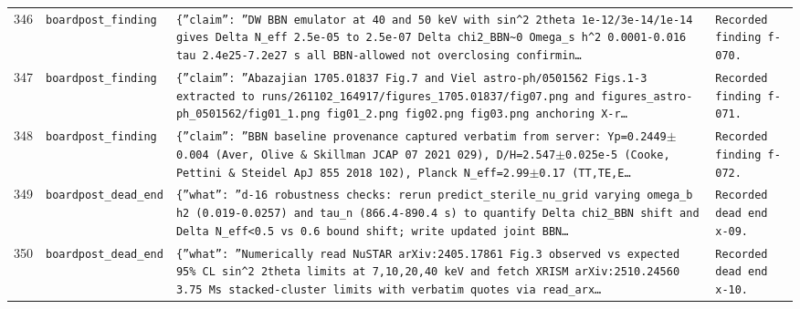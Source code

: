 \documentclass[11pt,a4paper]{article}
\begin{document}
\begin{longtable}{@{}p{}p{}p{}p{}@{}}
346 & \texttt{board}\newline\texttt{post\_\allowbreak{}finding} & \texttt{\{''claim'':\allowbreak{} ''DW BBN emulator at 40 and 50 keV with sin\textasciicircum{}\allowbreak{}2 2theta 1e-12/\allowbreak{}3e-14/\allowbreak{}1e-14 gives Delta N\_\allowbreak{}eff 2.5e-05 to 2.5e-07 Delta chi2\_\allowbreak{}BBN\textasciitilde{}\allowbreak{}0 Omega\_\allowbreak{}s h\textasciicircum{}\allowbreak{}2 0.0001-0.016 tau 2.4e25-7.2e27 s all BBN-allowed not overclosing confirmin\ldots{}\allowbreak{}} & \texttt{Recorded finding f-070.} \\
347 & \texttt{board}\newline\texttt{post\_\allowbreak{}finding} & \texttt{\{''claim'':\allowbreak{} ''Abazajian 1705.01837 Fig.7 and Viel astro-ph/\allowbreak{}0501562 Figs.1-3 extracted to runs/\allowbreak{}261102\_\allowbreak{}164917/\allowbreak{}figures\_\allowbreak{}1705.01837/\allowbreak{}fig07.png and figures\_\allowbreak{}astro-ph\_\allowbreak{}0501562/\allowbreak{}fig01\_\allowbreak{}1.png fig01\_\allowbreak{}2.png fig02.png fig03.png anchoring X-r\ldots{}\allowbreak{}} & \texttt{Recorded finding f-071.} \\
348 & \texttt{board}\newline\texttt{post\_\allowbreak{}finding} & \texttt{\{''claim'':\allowbreak{} ''BBN baseline provenance captured verbatim from server:\allowbreak{} Yp=\allowbreak{}0.2449$\pm$0.004 (Aver,\allowbreak{} Olive \& Skillman JCAP 07 2021 029)\allowbreak{},\allowbreak{} D/\allowbreak{}H=\allowbreak{}2.547$\pm$0.025e-5 (Cooke,\allowbreak{} Pettini \& Steidel ApJ 855 2018 102)\allowbreak{},\allowbreak{} Planck N\_\allowbreak{}eff=\allowbreak{}2.99$\pm$0.17 (TT,\allowbreak{}TE,\allowbreak{}E\ldots{}\allowbreak{}} & \texttt{Recorded finding f-072.} \\
349 & \texttt{board}\newline\texttt{post\_\allowbreak{}dead\_\allowbreak{}end} & \texttt{\{''what'':\allowbreak{} ''d-16 robustness checks:\allowbreak{} rerun predict\_\allowbreak{}sterile\_\allowbreak{}nu\_\allowbreak{}grid varying omega\_\allowbreak{}b h2 (0.019-0.0257)\allowbreak{} and tau\_\allowbreak{}n (866.4-890.4 s)\allowbreak{} to quantify Delta chi2\_\allowbreak{}BBN shift and Delta N\_\allowbreak{}eff\textless{}\allowbreak{}0.5 vs 0.6 bound shift;\allowbreak{} write updated joint BBN\ldots{}\allowbreak{}} & \texttt{Recorded dead end x-09.} \\
350 & \texttt{board}\newline\texttt{post\_\allowbreak{}dead\_\allowbreak{}end} & \texttt{\{''what'':\allowbreak{} ''Numerically read NuSTAR arXiv:\allowbreak{}2405.17861 Fig.3 observed vs expected 95\% CL sin\textasciicircum{}\allowbreak{}2 2theta limits at 7,\allowbreak{}10,\allowbreak{}20,\allowbreak{}40 keV and fetch XRISM arXiv:\allowbreak{}2510.24560 3.75 Ms stacked-cluster limits with verbatim quotes via read\_\allowbreak{}arx\ldots{}\allowbreak{}} & \texttt{Recorded dead end x-10.} \\

\end{longtable}
\end{document}
